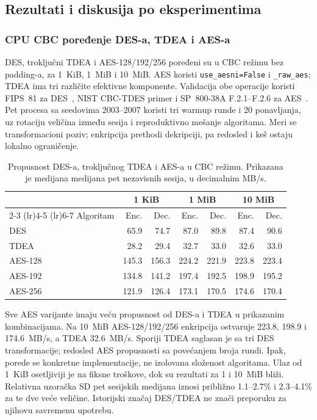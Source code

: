 \subsection{Rezultati i diskusija po eksperimentima}

\subsubsection{CPU CBC poređenje DES-a, TDEA i AES-a}
\label{sec:cpu-cbc-benchmark}
\label{sec:rezultati-cpu-cbc}
DES, troključni TDEA i AES-128/192/256 poređeni su u CBC režimu bez
padding-a, za 1~KiB, 1~MiB i 10~MiB. AES koristi
\texttt{use\_aesni=False} i \texttt{\_raw\_aes}; TDEA ima tri različite
efektivne komponente. Validacija obe operacije koristi FIPS~81 za
DES~\cite{fips81}, NIST CBC-TDES primer i SP~800-38A F.2.1--F.2.6 za
AES~\cite{sp800-38a}. Pet procesa sa seedovima 2003--2007 koristi tri
warmup runde i 20 ponavljanja, uz rotaciju veličina između sesija i
reproduktivno mešanje algoritama. Meri se transformacioni poziv;
enkripcija prethodi dekripciji, pa redosled i keš ostaju lokalno ograničenje.

\begin{table}[htbp]
\centering
\caption{Propusnost DES-a, troključnog TDEA i AES-a u CBC režimu.
Prikazana je medijana medijana pet nezavisnih sesija, u decimalnim MB/s.}
\label{tab:cpu-cbc-rezultati}
\begin{tabular}{lrrrrrr}
\toprule
& \multicolumn{2}{c}{1 KiB}
& \multicolumn{2}{c}{1 MiB}
& \multicolumn{2}{c}{10 MiB} \\
\cmidrule(lr){2-3}
\cmidrule(lr){4-5}
\cmidrule(lr){6-7}
Algoritam &
Enc. & Dec. &
Enc. & Dec. &
Enc. & Dec. \\
\midrule
DES     & 65.9  & 74.7  & 87.0  & 89.8  & 87.4  & 90.6 \\
TDEA    & 28.2  & 29.4  & 32.7  & 33.0  & 32.6  & 33.0 \\
AES-128 & 145.3 & 156.3 & 224.2 & 221.9 & 223.8 & 223.4 \\
AES-192 & 134.8 & 141.2 & 197.4 & 192.5 & 198.9 & 195.2 \\
AES-256 & 121.9 & 126.4 & 173.1 & 170.5 & 174.6 & 170.4 \\
\bottomrule
\end{tabular}
\end{table}

Sve AES varijante imaju veću propusnost od DES-a i TDEA u prikazanim
kombinacijama. Na 10~MiB AES-128/192/256 enkripcija ostvaruje 223.8,
198.9 i 174.6~MB/s, a TDEA 32.6~MB/s. Sporiji TDEA saglasan je sa tri
DES transformacije; redosled AES propusnosti sa povećanjem broja rundi.
Ipak, porede se konkretne implementacije, ne izolovana složenost algoritama.
Ulaz od 1~KiB osetljiviji je na fiksne troškove, dok su rezultati za
1 i 10~MiB bliži. Relativna uzoračka SD pet sesijskih medijana iznosi
približno 1.1--2.7\% i 2.3--4.1\% za te dve veće veličine.
Istorijski značaj DES/TDEA ne znači preporuku za njihovu savremenu upotrebu.

